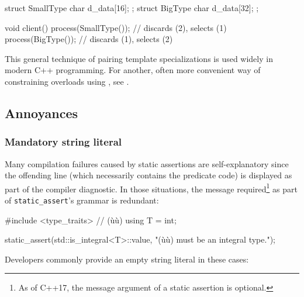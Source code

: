 \begin{emcppshiddenlisting}[emcppsbatch=e6]
struct SmallType { char d_data[16]; };
struct BigType   { char d_data[32]; };
\end{emcppshiddenlisting}
\begin{emcppslisting}[emcppsbatch=e6]
void client()
{
    process(SmallType());  // discards (2), selects (1)
    process(BigType());    // discards (1), selects (2)
}
\end{emcppslisting}

\noindent This general technique of pairing template specializations is used widely
in modern C++ programming. For another, often more convenient way of
constraining overloads using , see
.

\subsection[Annoyances]{Annoyances}\label{static-annoyances}

\subsubsection[Mandatory string literal]{Mandatory string literal}\label{mandatory-string-literal}

Many compilation failures caused by static assertions are
self-explanatory since the offending line (which necessarily contains the
predicate code) is displayed as part of the compiler diagnostic. In
those situations, the message required{\cprotect\footnote{As of C++17,
  the message argument of a static assertion is optional.}} as part of
\lstinline!static_assert!'s grammar is redundant:

\begin{emcppshiddenlisting}[emcppsbatch=e7]
#include <type_traits>  // (ù{}ù)
using T = int;
\end{emcppshiddenlisting}
\begin{emcppslisting}[emcppsbatch=e7]
static_assert(std::is_integral<T>::value, "(ù{}ù) must be an integral type.");
\end{emcppslisting}

\noindent Developers commonly provide an empty string literal in these
cases:

